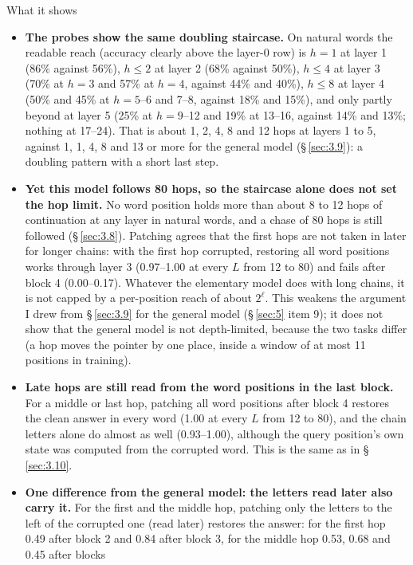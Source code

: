 \documentclass[paper=a4,fontsize=11pt,DIV=11,parskip=half,headings=small,numbers=noendperiod]{scrartcl}
\DeclareRobustCommand{\lead}[1]{\textsf{\bfseries\color{accent}#1}}
\begin{document}
\begin{findbox}{What it shows}
\begin{itemize}
\item \lead{The probes show the same doubling staircase.} On natural words the readable reach (accuracy clearly
  above the layer-0 row) is $h=1$ at layer 1 (86\% against 56\%), $h\le2$ at layer 2 (68\% against 50\%),
  $h\le4$ at layer 3 (70\% at $h=3$ and 57\% at $h=4$, against 44\% and 40\%), $h\le8$ at layer 4 (50\% and 45\%
  at $h=5$–6 and 7–8, against 18\% and 15\%), and only partly beyond at layer 5 (25\% at $h=9$–12 and 19\% at
  13–16, against 14\% and 13\%; nothing at 17–24). That is about 1, 2, 4, 8 and 12 hops at layers 1 to 5,
  against 1, 1, 4, 8 and 13 or more for the general model (\S\,\ref{sec:3.9}): a doubling pattern with a short
  last step.
\item \lead{Yet this model follows 80 hops, so the staircase alone does not set the hop limit.} No word position
  holds more than about 8 to 12 hops of continuation at any layer in natural words, and a chase of 80 hops is
  still followed (\S\,\ref{sec:3.8}). Patching agrees that the first hops are not taken in later for longer
  chains: with the first hop corrupted, restoring all word positions works through layer 3 (0.97–1.00 at every
  $L$ from 12 to 80) and fails after block 4 (0.00–0.17). Whatever the elementary model does with long chains,
  it is not capped by a per-position reach of about $2^\ell$. This weakens the argument I drew from
  \S\,\ref{sec:3.9} for the general model (\S\,\ref{sec:5} item 9); it does not show that the general model is
  not depth-limited, because the two tasks differ (a hop moves the pointer by one place, inside a window of at
  most 11 positions in training).
\item \lead{Late hops are still read from the word positions in the last block.} For a middle or last hop,
  patching all word positions after block 4 restores the clean answer in every word (1.00 at every $L$ from 12
  to 80), and the chain letters alone do almost as well (0.93–1.00), although the query position’s own state was
  computed from the corrupted word. This is the same as in \S\,\ref{sec:3.10}.
\item \lead{One difference from the general model: the letters read later also carry it.} For the first and the
  middle hop, patching only the letters to the left of the corrupted one (read later) restores the answer: for
  the first hop 0.49 after block 2 and 0.84 after block 3, for the middle hop 0.53, 0.68 and 0.45 after blocks

\end{itemize}
\end{findbox}
\end{document}
